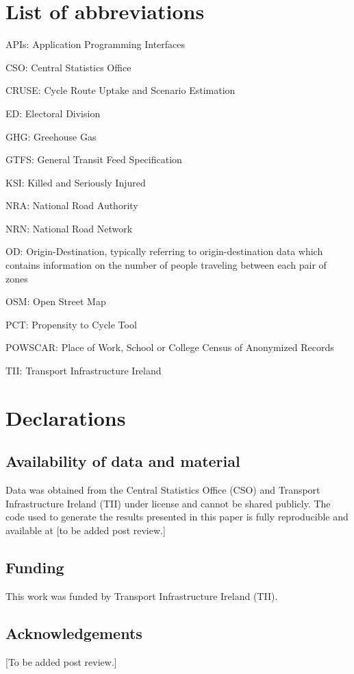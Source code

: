 \documentclass[
  super,
  preprint,
  3p]{elsarticle}
\begin{document}
\section{List of abbreviations}\label{list-of-abbreviations}

APIs: Application Programming Interfaces

CSO: Central Statistics Office

CRUSE: Cycle Route Uptake and Scenario Estimation

ED: Electoral Division

GHG: Greehouse Gas

GTFS: General Transit Feed Specification

KSI: Killed and Seriously Injured

NRA: National Road Authority

NRN: National Road Network

OD: Origin-Destination, typically referring to origin-destination data
which contains information on the number of people traveling between
each pair of zones

OSM: Open Street Map

PCT: Propensity to Cycle Tool

POWSCAR: Place of Work, School or College Census of Anonymized Records

TII: Transport Infrastructure Ireland

\section{Declarations}\label{declarations}

\subsection*{Availability of data and
material}\label{availability-of-data-and-material}

Data was obtained from the Central Statistics Office (CSO) and Transport
Infrastructure Ireland (TII) under license and cannot be shared
publicly. The code used to generate the results presented in this paper
is fully reproducible and available at {[}to be added post review.{]}

\subsection*{Funding}\label{funding}

This work was funded by Transport Infrastructure Ireland (TII).

\subsection*{Acknowledgements}\label{acknowledgements}

{[}To be added post review.{]}


  
\end{document}
